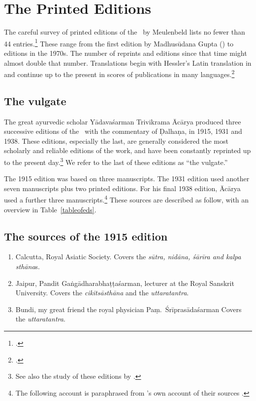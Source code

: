 \section{The Printed Editions}

The careful survey of printed editions of the \SS\ by Meulenbeld lists no fewer than 
44 entries.\footcite[IIB, 311--314]{meul-hist}  These range from the first edition 
by 
Madhusūdana Gupta (\citeyear{gupt-1835}) to editions in the 1970s. The 
number of 
reprints and editions since that time might almost double that number.  
Translations begin with Hessler's Latin translation in \citeyear{hess-1855} and 
continue up to the present in scores of publications in many 
languages.\footcites[E.g.,]{zysk-1984}[IIB, 314--315]{meul-hist}

\subsection{The vulgate}


The great ayurvedic scholar Yādavaśarman Trivikrama Ācārya produced three 
successive editions of the
\SS\ with the commentary of Ḍalhaṇa, in 1915, 1931 and 1938.  These
editions, especially the last, are generally considered the most 
scholarly
and reliable editions of the work, and have been constantly reprinted up
to the present day.\footnote{See also the study of these editions by \textcites[\S 
1.2]{kleb-2021b}[143--144]{wuja-2013}.}  We refer to the last of these editions 
as “the vulgate.”

The 1915 edition was based on three manuscripts.  The 1931 edition used another
seven manuscripts plus two printed editions.  For his final 1938 edition, Ācārya
used a further three manuscripts.\footnote{The following account is
paraphrased from \citeauthor{vulgate}'s own account of their sources
\citep[22]{vulgate}.}  These sources are described as follow, with an overview in
Table~\ref{tableofeds}.

\subsection{The sources of the 1915 edition}

\begin{enumerate}
    \item[1] Calcutta, Royal Asiatic Society.  Covers the \emph{sūtra, nidāna, śārīra 
        and 
        kalpa sthāna}s.  
    
    \item [2] Jaipur, Pandit Gaṅgādharabhaṭṭaśarman, lecturer at the Royal 
    Sanskrit University.  Covers the \emph{cikitsāsthāna} and the 
    \emph{uttaratantra}.
    
    \item [3]  Bundi, my great friend the royal physician Paṃ.\ Śrīprasādaśarman  
    Covers the \emph{uttaratantra}.
\end{enumerate}

